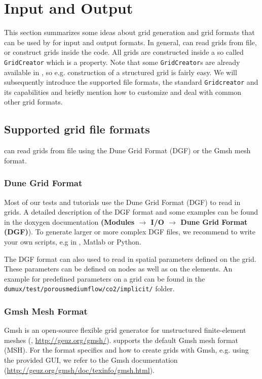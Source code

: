 \section{Input and Output}
\label{sec:inputandoutput}

This section summarizes some ideas about grid generation and grid formats that can be used by \Dumux
for input and output formats.
In general,
\Dumux can read grids from file, or construct grids inside the code. All grids are constructed inside a so called \texttt{GridCreator} which is a \Dumux property.
Note that some \texttt{GridCreator}s are already available in \Dumux, so e.g.
construction of a structured grid is fairly easy. We will subsequently introduce the supported file formats, the standard \texttt{Gridcreator} and its capabilities
and briefly mention how to customize and deal with common other grid formats.

\subsection{Supported grid file formats}
\Dumux can read grids from file using the Dune Grid Format (DGF) or the Gmsh mesh format.

\subsubsection{Dune Grid Format}
Most of our \Dumux tests and tutorials use the Dune Grid Format (DGF) to read in grids. A detailed description
of the DGF format and some examples can be found in the \Dune doxygen documentation
\textbf{(Modules $\rightarrow$ I/O $\rightarrow$ Dune Grid Format (DGF)}). To generate larger or more
complex DGF files, we recommend to write your own scripts, e.g in \Cplusplus, Matlab or Python.

The DGF format can also used to read in spatial parameters defined on the grid. These parameters can
be defined on nodes as well as on the elements. An example for predefined parameters on a grid
can be found in the  \texttt{dumux/test/porousmediumflow/co2/implicit/} folder.

\subsubsection{Gmsh Mesh Format}
Gmsh is an open-source flexible grid generator for unstructured finite-element meshes (\cite{GEUZAINE2009}, \url{http://geuz.org/gmsh/}).
\Dumux supports the default Gmsh mesh format (MSH). For the format specifics and how to create grids with Gmsh, e.g. using
the provided GUI, we refer to the Gmsh documentation (\url{http://geuz.org/gmsh/doc/texinfo/gmsh.html}).

